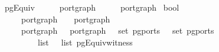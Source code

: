 \isamarkupfalse%
\ pgEquiv\ {\isacharcolon}{\isacharcolon}\ {\isachardoublequoteopen}{\isacharparenleft}\ \ \ \ port{\isacharunderscore}graph\ {\isasymRightarrow}\ {\isacharparenleft}\ \ \ \ port{\isacharunderscore}graph\isanewline
{}\ bool{\isachardoublequoteclose}\ {\isacharparenleft}\ {\isachardoublequoteopen}{\isasymapprox}{\isachardoublequoteclose}\ {}{}{\isacharparenright}\isanewline
\ \ \ {\isachardoublequoteopen}\ \ {\isasymequiv}\isanewline
\ \ \ \ {\isacharparenleft}{\isasymnot}\ port{\isacharunderscore}graph\ \ {\isasymand}\ {\isasymnot}\ port{\isacharunderscore}graph\ \ {\isasymor}\isanewline
\ \ \ \ {\isacharparenleft}\ port{\isacharunderscore}graph\ \ {\isasymand}\ port{\isacharunderscore}graph\ \ {\isasymand}\ set\ {\isacharparenleft}pg{\isacharunderscore}ports\ \ {\isacharequal}\ set\ {\isacharparenleft}pg{\isacharunderscore}ports\ \ {\isasymand}\isanewline
\ \ \ \ \ \ {\isacharparenleft}{\isasymexists}\ {\isacharcolon}{\isacharcolon}\ \ list\ {\isasymRightarrow}\ \ list{\isachardot}\ pgEquiv{\isacharunderscore}witness\ 
